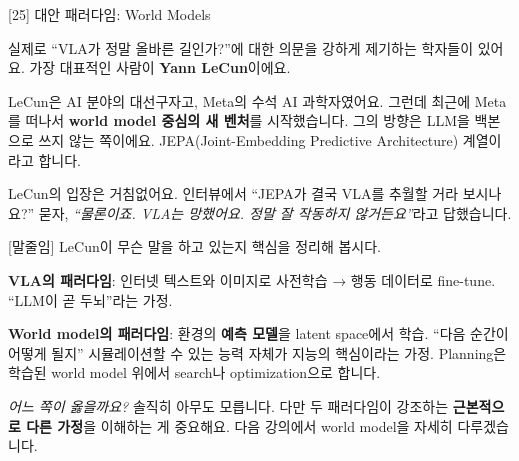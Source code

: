 \documentclass[aspectratio=169,10pt]{beamer}
\newenvironment{script}{%
  \footnotesize
  \setlength{\parskip}{0.5em}
  \setlength{\parindent}{0pt}
}{}
\begin{document}
\begin{frame}{[25] 대안 패러다임: World Models}
\begin{script}
실제로 ``VLA가 정말 올바른 길인가?''에 대한 의문을 강하게 제기하는 학자들이 있어요. 가장 대표적인 사람이 \textbf{Yann LeCun}이에요.

LeCun은 AI 분야의 대선구자고, Meta의 수석 AI 과학자였어요. 그런데 최근에 Meta를 떠나서 \textbf{world model 중심의 새 벤처}를 시작했습니다. 그의 방향은 \alert{LLM을 백본으로 쓰지 않는 쪽}이에요. JEPA(Joint-Embedding Predictive Architecture) 계열이라고 합니다.

LeCun의 입장은 거침없어요. 인터뷰에서 ``JEPA가 결국 VLA를 추월할 거라 보시나요?'' 묻자, \textit{``물론이죠. VLA는 망했어요. 정말 잘 작동하지 않거든요''}라고 답했습니다.

[말줄임] LeCun이 무슨 말을 하고 있는지 핵심을 정리해 봅시다.

\textbf{VLA의 패러다임}: 인터넷 텍스트와 이미지로 사전학습 → 행동 데이터로 fine-tune. ``LLM이 곧 두뇌''라는 가정.

\textbf{World model의 패러다임}: 환경의 \textbf{예측 모델}을 latent space에서 학습. ``다음 순간이 어떻게 될지'' 시뮬레이션할 수 있는 능력 자체가 지능의 핵심이라는 가정. Planning은 학습된 world model 위에서 search나 optimization으로 합니다.

\textit{어느 쪽이 옳을까요?} 솔직히 아무도 모릅니다. 다만 두 패러다임이 강조하는 \textbf{근본적으로 다른 가정}을 이해하는 게 중요해요. 다음 강의에서 world model을 자세히 다루겠습니다.
\end{script}
\end{frame}
\end{document}
